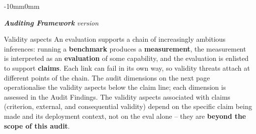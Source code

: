 {}
\label{sec:framework}

\begin{adjustwidth}{-10mm}{0mm}

\noindent
{\LARGE\itshape \textbf{Auditing Framework}}\hfill
{\small\itshape\color{black!55}version \aauditframework}

\smallskip

\noindent
\begin{dsbox}[top=1mm, bottom=1mm, before skip=3pt, after skip=3pt]{Validity aspects}
\footnotesize
An evaluation supports a chain of increasingly ambitious inferences:
running a \textbf{benchmark} produces a \textbf{measurement}, the
measurement is interpreted as an \textbf{evaluation} of some
capability, and the evaluation is enlisted to support \textbf{claims}.
Each link can fail in its own way, so validity threats attach at
different points of the chain. The audit dimensions on the next page
operationalise the validity aspects below the claim line; each
dimension is assessed in the Audit Findings. The validity aspects
associated with claims (criterion, external, and consequential
validity) depend on the specific claim being made and its deployment
context, not on the eval alone -- they are \textbf{beyond the scope of
this audit}.
\end{dsbox}

\smallskip


\end{adjustwidth}
